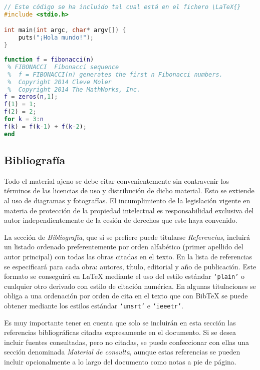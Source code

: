 \begin{lstlisting}[style=ruled,language=C,caption={Ejemplo de código C},label=lst:codC]
// Este código se ha incluido tal cual está en el fichero \LaTeX{}
#include <stdio.h>

int main(int argc, char* argv[]) {
	puts("¡Hola mundo!");
}
\end{lstlisting}


\begin{lstlisting}[style=ruled,language=Matlab,caption={Ejemplo escrito en Matlab},label=lst:matlab]
function f = fibonacci(n)
 % FIBONACCI  Fibonacci sequence
 %	f = FIBONACCI(n) generates the first n Fibonacci numbers.
 %	Copyright 2014 Cleve Moler
 %	Copyright 2014 The MathWorks, Inc.
f = zeros(n,1); 
f(1) = 1;
f(2) = 2;
for k = 3:n
f(k) = f(k-1) + f(k-2);
end
\end{lstlisting}






\subsection{Bibliografía}
Todo el material ajeno se debe citar convenientemente sin contravenir los términos de las licencias de uso y distribución de dicho material. Esto se extiende al uso de diagramas y fotografías. El incumplimiento de la legislación vigente en materia de protección de la propiedad intelectual es responsabilidad exclusiva del autor independientemente de la cesión de derechos que este haya convenido.

La sección de \emph{Bibliografía}, que si se prefiere puede titularse \emph{Referencias}, incluirá un listado ordenado preferentemente por orden alfabético (primer apellido del autor principal) con todas las obras citadas en el texto. En la lista de referencias se especificará para cada obra: autores, título, editorial y año de publicación. Este formato se conseguirá en \LaTeX{} mediante el uso del estilo estándar \texttt{`plain'} o cualquier otro derivado con estilo de citación numérica. En algunas titulaciones se obliga a una ordenación por orden de cita en el texto que con Bib\TeX{} se puede obtener mediante los estilos estándar \texttt{`unsrt'} e \texttt{`ieeetr'}. 

Es muy importante tener en cuenta que solo se incluirán en esta sección las referencias bibliográficas citadas expresamente en el documento. Si se desea incluir fuentes consultadas, pero no citadas, se puede confeccionar con ellas una sección denominada \emph{Material de consulta}, aunque estas referencias se pueden incluir opcionalmente a lo largo del documento como notas a pie de página.

